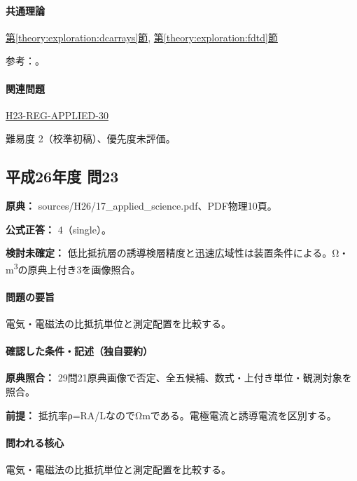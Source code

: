 \paragraph{共通理論} \hyperref[theory:exploration:dcarrays]{第\ref*{theory:exploration:dcarrays}節}, \hyperref[theory:exploration:fdtd]{第\ref*{theory:exploration:fdtd}節}

\par 参考：\cite{epa_resistivity,epa_fdem}。

\paragraph{関連問題} \hyperref[q:h23-reg-applied-30]{H23-REG-APPLIED-30}

\par 難易度 2（校準初稿）、優先度未評価。

\subsection{平成26年度 問23}
\label{q:h26-reg-applied-23}

\noindent\textbf{原典：} sources/H26/17\_applied\_science.pdf、PDF物理10頁。

\textbf{公式正答：} 4（single）。

\par\textbf{検討未確定：} 低比抵抗層の誘導検層精度と迅速広域性は装置条件による。Ω・m\textsuperscript{3}の原典上付き3を画像照合。

\paragraph{問題の要旨} 電気・電磁法の比抵抗単位と測定配置を比較する。

\paragraph{確認した条件・記述（独自要約）}\mbox{}\par

\noindent\textbf{原典照合：} 29問21原典画像で否定、全五候補、数式・上付き単位・観測対象を照合。\par

\noindent\textbf{前提：} 抵抗率ρ=RA/LなのでΩmである。電極電流と誘導電流を区別する。\par

\paragraph{問われる核心} 電気・電磁法の比抵抗単位と測定配置を比較する。

